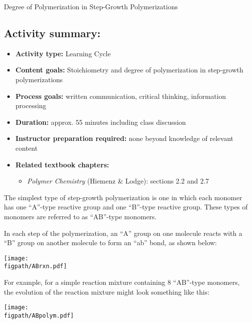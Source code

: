 \begin{activity}{Degree of Polymerization in Step-Growth Polymerizations}
\begin{instructornotes}
	\subsection*{Activity summary:}
	\begin{itemize}
		\item \textbf{Activity type:} Learning Cycle
		\item \textbf{Content goals:} Stoichiometry and degree of polymerization in step-growth polymerizations
		\item \textbf{Process goals:} %
			written communication, critical thinking, information processing
		\item \textbf{Duration:} approx. 55 minutes including class discussion
		\item \textbf{Instructor preparation required:} none beyond knowledge of relevant content
		\item \textbf{Related textbook chapters:}
			\begin{itemize}
				\item \emph{Polymer Chemistry} (Hiemenz \& Lodge): sections 2.2 and 2.7
			\end{itemize}
	\end{itemize}

\end{instructornotes}


\begin{model}

The simplest type of step-growth polymerization is one in which each monomer has one ``A''-type reactive group and one ``B''-type reactive group.
These types of monomers are referred to as ``AB''-type monomers.

In each step of the polymerization, an ``A'' group on one molecule reacts with a ``B'' group on another molecule to form an ``ab'' bond, as shown below:

\vspace{0.1in}
\centerline{\texttt{[image: \\figpath/ABrxn.pdf]}}

For example, for a simple reaction mixture containing 8 ``AB''-type monomers, the evolution of the reaction mixture might look something like this:

\vspace{0.1in}
\centerline{\texttt{[image: \\figpath/ABpolym.pdf]}}


\end{model}
\end{activity}
